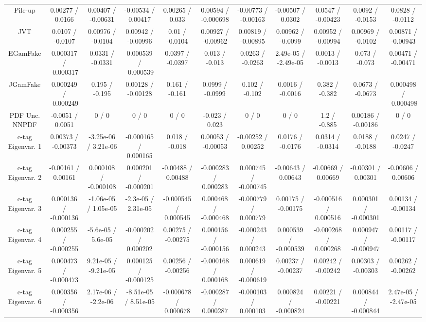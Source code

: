 \begin{table}[htbp]
\begin{center}
\begin{tabular}{|c|c|c|c|c|c|c|c|c|c|c|}
  Pile-up & 0.00277 / 0.0166 & 0.00407 / -0.00631 & -0.00534 / 0.00417 & 0.00265 / 0.033 & 0.00594 / -0.000698 & -0.00773 / -0.00163 & -0.00507 / 0.0302 & 0.0547 / -0.00423 & 0.0092 / -0.0153 & 0.0828 / -0.0112 \\ 
  JVT & 0.0107 / -0.0107 & 0.00976 / -0.0104 & 0.00942 / -0.00996 & 0.01 / -0.0104 & 0.00927 / -0.00962 & 0.00819 / -0.00895 & 0.00962 / -0.0099 & 0.00952 / -0.00994 & 0.00969 / -0.0102 & 0.00871 / -0.00943 \\ 
  EGamFake & 0.000317 / -0.000317 & 0.0331 / -0.0331 & 0.000539 / -0.000539 & 0.0397 / -0.0397 & 0.013 / -0.013 & 0.0263 / -0.0263 & 2.49e-05 / -2.49e-05 & 0.0013 / -0.0013 & 0.073 / -0.073 & 0.00471 / -0.00471 \\ 
  JGamFake & 0.000249 / -0.000249 & 0.195 / -0.195 & 0.00128 / -0.00128 & 0.161 / -0.161 & 0.0999 / -0.0999 & 0.102 / -0.102 & 0.0016 / -0.0016 & 0.382 / -0.382 & 0.0673 / -0.0673 & 0.000498 / -0.000498 \\ 
  PDF Unc. NNPDF & -0.0051 / 0.0051 & 0 / 0 & 0 / 0 & 0 / 0 & -0.023 / 0.023 & 0 / 0 & 0 / 0 & 1.2 / -0.885 & 0.00186 / -0.00186 & 0 / 0 \\ 
  c-tag Eigenvar. 1 & 0.00373 / -0.00373 & -3.25e-06 / 3.21e-06 & -0.000165 / 0.000165 & 0.018 / -0.018 & 0.00053 / -0.00053 & -0.00252 / 0.00252 & 0.0176 / -0.0176 & 0.0314 / -0.0314 & 0.0188 / -0.0188 & 0.0247 / -0.0247 \\ 
  c-tag Eigenvar. 2 & -0.00161 / 0.00161 & 0.000108 / -0.000108 & 0.000201 / -0.000201 & -0.00488 / 0.00488 & -0.000283 / 0.000283 & 0.000745 / -0.000745 & -0.00643 / 0.00643 & -0.00669 / 0.00669 & -0.00301 / 0.00301 & -0.00606 / 0.00606 \\ 
  c-tag Eigenvar. 3 & 0.000136 / -0.000136 & -1.06e-05 / 1.05e-05 & -2.3e-05 / 2.31e-05 & -0.000545 / 0.000545 & 0.000468 / -0.000468 & -0.000779 / 0.000779 & 0.00175 / -0.00175 & -0.000516 / 0.000516 & 0.000301 / -0.000301 & 0.00134 / -0.00134 \\ 
  c-tag Eigenvar. 4 & 0.000255 / -0.000255 & -5.6e-05 / 5.6e-05 & -0.000202 / 0.000202 & 0.00275 / -0.00275 & 0.000156 / -0.000156 & -0.000243 / 0.000243 & 0.000539 / -0.000539 & -0.000268 / 0.000268 & 0.000947 / -0.000947 & 0.00117 / -0.00117 \\ 
  c-tag Eigenvar. 5 & 0.000473 / -0.000473 & 9.21e-05 / -9.21e-05 & 0.000125 / -0.000125 & 0.00256 / -0.00256 & -0.000168 / 0.000168 & 0.000619 / -0.000619 & 0.00237 / -0.00237 & 0.00242 / -0.00242 & 0.00303 / -0.00303 & 0.00262 / -0.00262 \\ 
  c-tag Eigenvar. 6 & 0.000356 / -0.000356 & 2.17e-06 / -2.2e-06 & -8.51e-05 / 8.51e-05 & -0.000678 / 0.000678 & -0.000287 / 0.000287 & -0.000103 / 0.000103 & 0.000824 / -0.000824 & 0.00221 / -0.00221 & 0.000844 / -0.000844 & 2.47e-05 / -2.47e-05 \\ 

\end{tabular}
\end{center}
\end{table}

